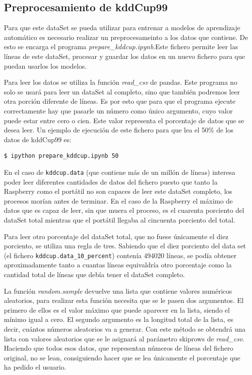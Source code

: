 \documentclass[a4paper, 12pt]{book}
\begin{document}
\subsection{Preprocesamiento de kddCup99}
\label{subsec:preprocesamiento_kddcup}

Para que este dataSet se pueda utilizar para entrenar a modelos de aprendizaje automático es necesario realizar un preprocesameinto a los datos que contiene. De esto se encarga el programa \textit{prepare\_kddcup.ipynb}.Este fichero permite leer las líneas de este dataSet, procesar y guardar los datos en un nuevo fichero para que puedan usarlos los modelos.

Para leer los datos se utiliza la función \textit{read\_csv} de pandas. Este programa no solo se usará para leer un dataSet al completo, sino que también podremos leer otra porción diferente de líneas. Es por esto que para que el programa ejecute correctamente hay que pasarle un número como único argumento, cuyo valor puede estar entre cero o cien. Este valor representa el porcentaje de datos que se desea leer. Un ejemplo de ejecución de este fichero para que lea el 50\% de los datos de kddCup99 es:\\

\begin{lstlisting}[language=bash]
    $ ipython prepare_kddcup.ipynb 50
\end{lstlisting}

En el caso de \texttt{kddcup.data} (que contiene más de un millón de líneas) interesa poder leer diferentes cantidades de datos del fichero puesto que tanto la Raspberry como el portátil no son capaces de leer este dataSet completo, los procesos morían antes de terminar. En el caso de la Raspberry el máximo de datos que es capaz de leer, sin que muera el proceso, es el cuarenta porciento del dataSet total mientras que el portátil llegaba al cincuenta porciento del total.

Para leer otro porcentaje del dataSet total, que no fuese únicamente el diez porciento, se utiliza una regla de tres. Sabiendo que el diez porciento del data set (el fichero \texttt{kddcup.data\_10\_percent}) contenía 494020 líneas, se podía obtener aproximadamente tanto a cuantas líneas equivaldría otro porcentaje como la cantidad total de líneas que debía tener el dataSet completo.

La función \textit{random.sample} devuelve una lista que contiene valores numéricos aleatorios, para realizar esta función necesita que se le pasen dos argumentos. El primero de ellos es el valor máximo que puede aparecer en la lista, siendo el mínimo igual a cero. El segundo argumento es la longitud total de la lista, es decir, cuántos números aleatorios va a generar. Con este método se obtendrá una lista con valores aleatorios que se le asignará al parámetro skiprows de \textit{read\_csv}. Haciendo que todos esos datos, que representan números de líneas del fichero original, no se lean, consiguiendo hacer que se lea únicamente el porcentaje que ha pedido el usuario.
\end{document}
